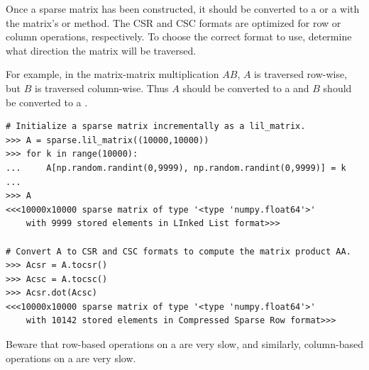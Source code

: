Once a sparse matrix has been constructed, it should be converted to a  or a  with the matrix's  or  method.
The CSR and CSC formats are optimized for row or column operations, respectively.
To choose the correct format to use, determine what direction the matrix will be traversed.%

For example, in the matrix-matrix multiplication $AB$, $A$ is traversed row-wise, but $B$ is traversed column-wise.
Thus $A$ should be converted to a  and $B$ should be converted to a .

\begin{lstlisting}
# Initialize a sparse matrix incrementally as a lil_matrix.
>>> A = sparse.lil_matrix((10000,10000))
>>> for k in range(10000):
...     A[np.random.randint(0,9999), np.random.randint(0,9999)] = k
...
>>> A
<<<10000x10000 sparse matrix of type '<type 'numpy.float64'>'
    with 9999 stored elements in LInked List format>>>

# Convert A to CSR and CSC formats to compute the matrix product AA.
>>> Acsr = A.tocsr()
>>> Acsc = A.tocsc()
>>> Acsr.dot(Acsc)
<<<10000x10000 sparse matrix of type '<type 'numpy.float64'>'
    with 10142 stored elements in Compressed Sparse Row format>>>
\end{lstlisting}

Beware that row-based operations on a  are very slow, and similarly, column-based operations on a  are very slow.


